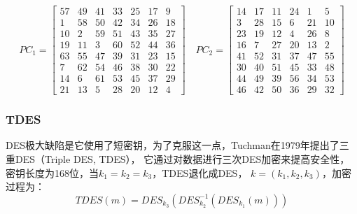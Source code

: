 $$
PC_1 =
\begin{bmatrix}
57 & 49 & 41 & 33 & 25 & 17 & 9 \\
1  & 58 & 50 & 42 & 34 & 26 & 18 \\
10 & 2  & 59 & 51 & 43 & 35 & 27 \\
19 & 11 & 3  & 60 & 52 & 44 & 36 \\
63 & 55 & 47 & 39 & 31 & 23 & 15 \\
7  & 62 & 54 & 46 & 38 & 30 & 22 \\
14 & 6  & 61 & 53 & 45 & 37 & 29 \\
21 & 13 & 5  & 28 & 20 & 12 & 4
\end{bmatrix}
\quad
PC_2 =
\begin{bmatrix}
14 & 17 & 11 & 24 & 1  & 5  \\
3  & 28 & 15 & 6  & 21 & 10 \\
23 & 19 & 12 & 4  & 26 & 8  \\
16 & 7  & 27 & 20 & 13 & 2  \\
41 & 52 & 31 & 37 & 47 & 55 \\
30 & 40 & 51 & 45 & 33 & 48 \\
44 & 49 & 39 & 56 & 34 & 53 \\
46 & 42 & 50 & 36 & 29 & 32
\end{bmatrix}
$$

\subsubsection{TDES}
DES极大缺陷是它使用了短密钥，为了克服这一点，Tuchman在1979年提出了三重DES（Triple DES, TDES），
它通过对数据进行三次DES加密来提高安全性，密钥长度为168位，当$k_1=k_2=k_3$，TDES退化成DES，
$k=(k_1, k_2, k_3)$，加密过程为：
$$ TDES(m)=DES_{k_3}(DES^{-1}_{k_2}(DES_{k_1}(m))) $$